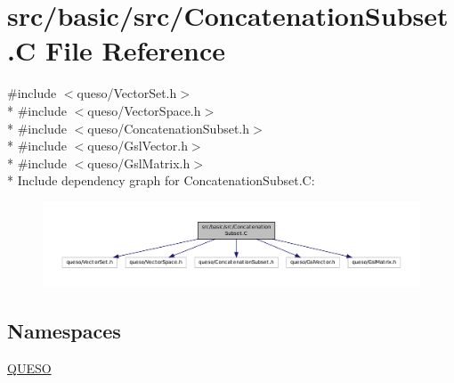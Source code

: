 \hypertarget{_concatenation_subset_8_c}{\section{src/basic/src/\-Concatenation\-Subset.C File Reference}
\label{_concatenation_subset_8_c}
}
{\ttfamily \#include $<$queso/\-Vector\-Set.\-h$>$}\\*
{\ttfamily \#include $<$queso/\-Vector\-Space.\-h$>$}\\*
{\ttfamily \#include $<$queso/\-Concatenation\-Subset.\-h$>$}\\*
{\ttfamily \#include $<$queso/\-Gsl\-Vector.\-h$>$}\\*
{\ttfamily \#include $<$queso/\-Gsl\-Matrix.\-h$>$}\\*
Include dependency graph for Concatenation\-Subset.\-C\-:
\nopagebreak
\begin{figure}[H]
\begin{center}
\leavevmode
\includegraphics[width=350pt]{_concatenation_subset_8_c__incl}
\end{center}
\end{figure}
\subsection*{Namespaces}
\begin{DoxyCompactItemize}
\item 
\hyperlink{namespace_q_u_e_s_o}{Q\-U\-E\-S\-O}
\end{DoxyCompactItemize}
